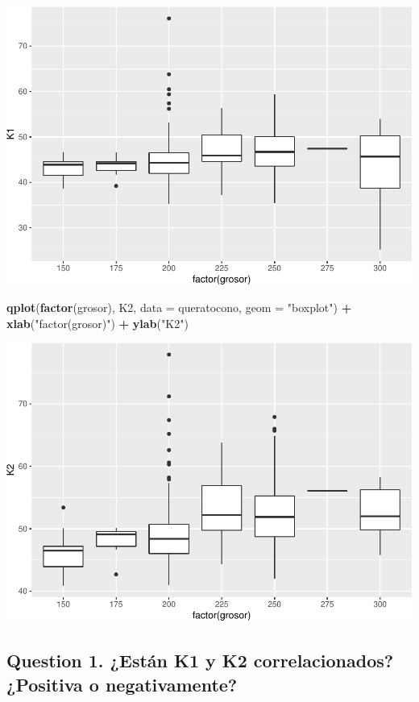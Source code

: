 \documentclass[]{article}
\newenvironment{Shaded}{\begin{snugshade}}{\end{snugshade}}
\newcommand{\DataTypeTok}[1]{\textcolor[rgb]{0.13,0.29,0.53}{#1}}
\newcommand{\KeywordTok}[1]{\textcolor[rgb]{0.13,0.29,0.53}{\textbf{#1}}}
\newcommand{\NormalTok}[1]{#1}
\newcommand{\OperatorTok}[1]{\textcolor[rgb]{0.81,0.36,0.00}{\textbf{#1}}}
\newcommand{\StringTok}[1]{\textcolor[rgb]{0.31,0.60,0.02}{#1}}
\begin{document}
\includegraphics{document_files/figure-latex/unnamed-chunk-8-1.pdf}

\begin{Shaded}
\begin{Highlighting}[]
\KeywordTok{qplot}\NormalTok{(}\KeywordTok{factor}\NormalTok{(grosor), K2, }\DataTypeTok{data =}\NormalTok{ queratocono, }\DataTypeTok{geom =} \StringTok{"boxplot"}\NormalTok{) }\OperatorTok{+}
\StringTok{  }\KeywordTok{xlab}\NormalTok{(}\StringTok{"factor(grosor)"}\NormalTok{) }\OperatorTok{+}\StringTok{ }\KeywordTok{ylab}\NormalTok{(}\StringTok{"K2"}\NormalTok{)}
\end{Highlighting}
\end{Shaded}

\includegraphics{document_files/figure-latex/unnamed-chunk-8-2.pdf}

\hypertarget{question-1}{%
	\subsection{Question 1. ¿Están K1 y K2 correlacionados? ¿Positiva o negativamente?}\label{question-1}}
\end{document}
